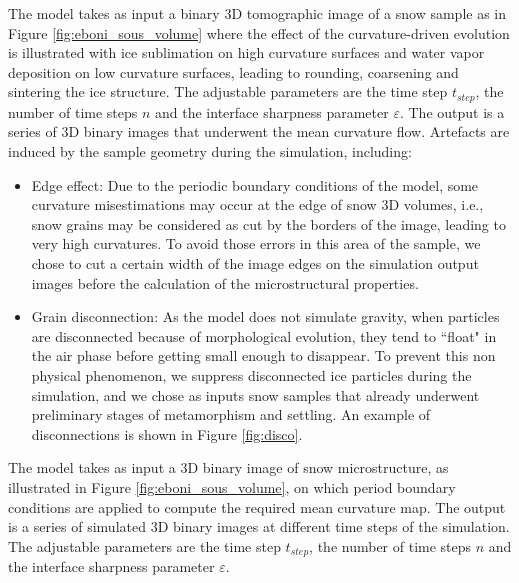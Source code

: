 \documentclass[draft,ms]{agujournal2019}
\begin{document}
The model takes as input a binary 3D tomographic image of a snow sample as in Figure \ref{fig:eboni_sous_volume} where the effect of the curvature-driven evolution is illustrated with ice sublimation on high curvature surfaces and water vapor deposition on low curvature surfaces, leading to rounding, coarsening and sintering the ice structure. The adjustable parameters are the time step $t_{step}$, the number of time steps $n$ and the interface sharpness parameter $\varepsilon$. The output is a series of 3D binary images that underwent the mean curvature flow. Artefacts are induced by the sample geometry during the simulation, including: 
\begin{itemize}[label=-]
\item Edge effect: Due to the periodic boundary conditions of the model, some curvature misestimations may occur at the edge of snow 3D volumes, i.e., snow grains may be considered as cut by the borders of the image, leading to very high curvatures. To avoid those errors  in this area of the sample, we chose to cut a certain width of the image edges on the simulation output images before the calculation of the microstructural properties.\\
\vspace{0.1cm}

\item Grain disconnection: As the model does not simulate gravity, when particles are disconnected because of morphological evolution, they tend to ``float" in the air phase before getting small enough to disappear. To prevent this non physical phenomenon, we suppress disconnected ice particles during the simulation, and we chose as inputs snow samples that already underwent preliminary stages of metamorphism and settling. An example of disconnections is shown in Figure \ref{fig:disco}. 
\end{itemize}


The model takes as input a 3D binary image of snow microstructure, as illustrated in Figure \ref{fig:eboni_sous_volume}, on which period boundary conditions are applied to compute the required mean curvature map. The output is a series of simulated 3D binary images at different time steps of the simulation. The adjustable parameters are the time step $t_{step}$, the number of time steps $n$ and the interface sharpness parameter $\varepsilon$. 
\end{document}
